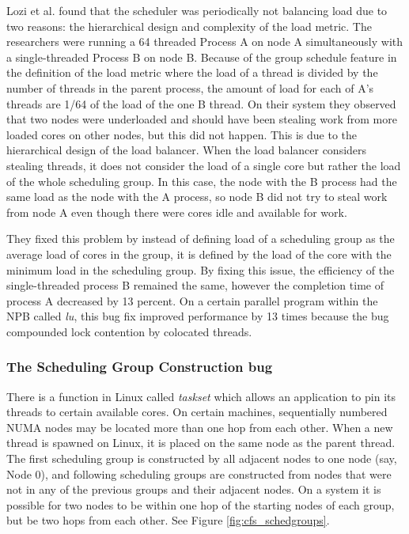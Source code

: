\documentclass{sig-alternate}
\begin{document}
Lozi et al. found that the scheduler was periodically not balancing load due to two reasons: the hierarchical design and complexity of the load metric. The researchers were running a 64 threaded Process A on node A simultaneously with a single-threaded Process B on node B. Because of the group schedule feature in the definition of the load metric where the load of a thread is divided by the number of threads in the parent process, the amount of load for each of A's threads are 1/64 of the load of the one B thread. On their system they observed that two nodes were underloaded and should have been stealing work from more loaded cores on other nodes, but this did not happen. This is due to the hierarchical design of the load balancer. When the load balancer considers stealing threads, it does not consider the load of a single core but rather the load of the whole scheduling group. In this case, the node with the B process had the same load as the node with the A process, so node B did not try to steal work from node A even though there were cores idle and available for work.~\cite{Lozi:2016}

They fixed this problem by instead of defining load of a scheduling group as the average load of cores in the group, it is defined by the load of the core with the minimum load in the scheduling group. By fixing this issue, the efficiency of the single-threaded process B remained the same, however the completion time of process A decreased by 13 percent. On a certain parallel program within the NPB called \textit{lu}, this bug fix improved performance by 13 times because the bug compounded lock contention by colocated threads.~\cite{Lozi:2016}

\subsubsection{The Scheduling Group Construction bug}
\label{sec:cfsfault_grpconstruct}

There is a function in Linux called \emph{taskset} which allows an application to pin its threads to certain available cores. On certain machines, sequentially numbered NUMA nodes may be located more than one hop from each other. When a new thread is spawned on Linux, it is placed on the same node as the parent thread. The first scheduling group is constructed by all adjacent nodes to one node (say, Node 0), and following scheduling groups are constructed from nodes that were not in any of the previous groups and their adjacent nodes. On a system it is possible for two nodes to be within one hop of the starting nodes of each group, but be two hops from each other. See Figure \ref{fig:cfs_schedgroups}.~\cite{Lozi:2016}
\end{document}
